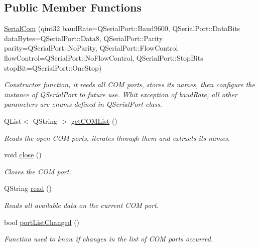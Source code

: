 \subsection*{Public Member Functions}
\begin{DoxyCompactItemize}
\item 
\hyperlink{classSerialCom_a8d632d66c4b9813b7e41f3a2b4238e7d}{Serial\+Com} (qint32 baud\+Rate=Q\+Serial\+Port\+::\+Baud9600, Q\+Serial\+Port\+::\+Data\+Bits data\+Bytes=Q\+Serial\+Port\+::\+Data8, Q\+Serial\+Port\+::\+Parity parity=Q\+Serial\+Port\+::\+No\+Parity, Q\+Serial\+Port\+::\+Flow\+Control flow\+Control=Q\+Serial\+Port\+::\+No\+Flow\+Control, Q\+Serial\+Port\+::\+Stop\+Bits stop\+Bit=Q\+Serial\+Port\+::\+One\+Stop)
\begin{DoxyCompactList}\small\item\em Constructor function, it reeds all C\+OM ports, stores it\textquotesingle{}s names, then configure the instance of Q\+Serial\+Port to future use. Whit exception of baud\+Rate, all other parameters are enums defined in Q\+Serial\+Port class. \end{DoxyCompactList}\item 
Q\+List$<$ Q\+String $>$ \hyperlink{classSerialCom_ac9a5c3d791e3854e18f5cf36e1626d5f}{get\+C\+O\+M\+List} ()
\begin{DoxyCompactList}\small\item\em Reads the open C\+OM ports, iterates through them and extracts it\textquotesingle{}s names. \end{DoxyCompactList}\item 
\mbox{\label{classSerialCom_ace69c1729ccc045f519131a50c949ac1}} 
void \hyperlink{classSerialCom_ace69c1729ccc045f519131a50c949ac1}{close} ()
\begin{DoxyCompactList}\small\item\em Closes the C\+OM port. \end{DoxyCompactList}\item 
Q\+String \hyperlink{classSerialCom_ad601cc1e7675a979600a8f469fe2e611}{read} ()
\begin{DoxyCompactList}\small\item\em Reads all available data on the current C\+OM port. \end{DoxyCompactList}\item 
bool \hyperlink{classSerialCom_ad4ae114a9e7b76b958776799743dd8a5}{port\+List\+Changed} ()
\begin{DoxyCompactList}\small\item\em Function used to know if changes in the list of C\+OM ports occurred. \end{DoxyCompactList}\end{DoxyCompactItemize}


